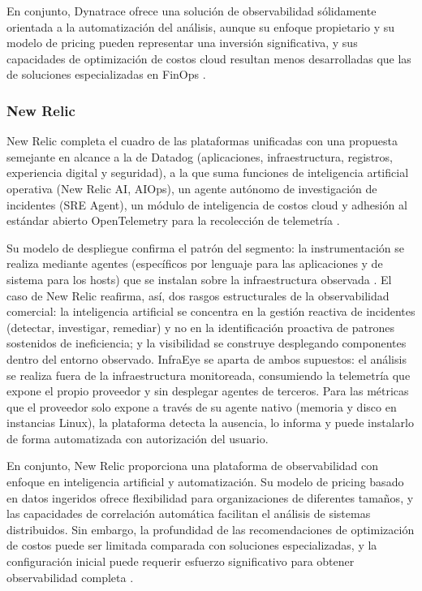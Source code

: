 En conjunto, Dynatrace ofrece una solución de observabilidad sólidamente orientada a la automatización del análisis, aunque su enfoque propietario y su modelo de pricing pueden representar una inversión significativa, y sus capacidades de optimización de costos cloud resultan menos desarrolladas que las de soluciones especializadas en FinOps \parencite{Dynatrace2026}.

\subsubsection{New Relic}

New Relic completa el cuadro de las plataformas unificadas con una propuesta semejante en alcance a la de Datadog (aplicaciones, infraestructura, registros, experiencia digital y seguridad), a la que suma funciones de inteligencia artificial operativa (New Relic AI, AIOps), un agente autónomo de investigación de incidentes (SRE Agent), un módulo de inteligencia de costos cloud y adhesión al estándar abierto OpenTelemetry para la recolección de telemetría \parencite{NewRelic2026}.

Su modelo de despliegue confirma el patrón del segmento: la instrumentación se realiza mediante agentes (específicos por lenguaje para las aplicaciones y de sistema para los hosts) que se instalan sobre la infraestructura observada \parencite{NewRelic2026}. El caso de New Relic reafirma, así, dos rasgos estructurales de la observabilidad comercial: la inteligencia artificial se concentra en la gestión reactiva de incidentes (detectar, investigar, remediar) y no en la identificación proactiva de patrones sostenidos de ineficiencia; y la visibilidad se construye desplegando componentes dentro del entorno observado. InfraEye se aparta de ambos supuestos: el análisis se realiza fuera de la infraestructura monitoreada, consumiendo la telemetría que expone el propio proveedor y sin desplegar agentes de terceros. Para las métricas que el proveedor solo expone a través de su agente nativo (memoria y disco en instancias Linux), la plataforma detecta la ausencia, lo informa y puede instalarlo de forma automatizada con autorización del usuario.

En conjunto, New Relic proporciona una plataforma de observabilidad con enfoque en inteligencia artificial y automatización. Su modelo de pricing basado en datos ingeridos ofrece flexibilidad para organizaciones de diferentes tamaños, y las capacidades de correlación automática facilitan el análisis de sistemas distribuidos. Sin embargo, la profundidad de las recomendaciones de optimización de costos puede ser limitada comparada con soluciones especializadas, y la configuración inicial puede requerir esfuerzo significativo para obtener observabilidad completa \parencite{NewRelic2026}.

